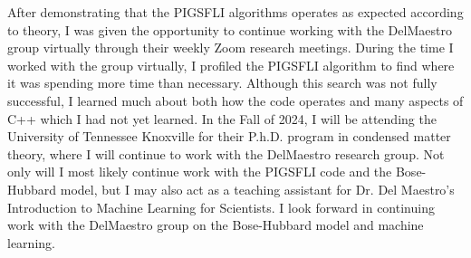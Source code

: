 After demonstrating that the PIGSFLI algorithms operates as expected according to theory, I was given the opportunity to continue working with the DelMaestro group virtually through their weekly Zoom research meetings. During the time I worked with the group virtually, I profiled the PIGSFLI algorithm to find where it was spending more time than necessary. Although this search was not fully successful, I learned much about both how the code operates and many aspects of C++ which I had not yet learned. In the Fall of 2024, I will be attending the University of Tennessee Knoxville for their P.h.D. program in condensed matter theory, where I will continue to work with the DelMaestro research group. Not only will I most likely continue work with the PIGSFLI code and the Bose-Hubbard model, but I may also act as a teaching assistant for Dr. Del Maestro's Introduction to Machine Learning for Scientists. I look forward in continuing work with the DelMaestro group on the Bose-Hubbard model and machine learning.